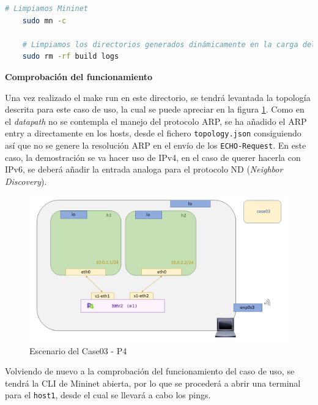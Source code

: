\begin{lstlisting}[language= bash, style=Consola, caption={Limpieza segura del escenario P4 - Case03},label=code:case03_p4_ether_unload2]
    # Limpiamos Mininet
    sudo mn -c
    
    # Limpiamos los directorios generados dinámicamente en la carga del escenario
    sudo rm -rf build logs
\end{lstlisting}


\vspace{1cm}
\textbf{Comprobación del funcionamiento}\\
\par

Una vez realizado el make run en este directorio, se tendrá levantada la topología descrita para este caso de uso, la cual se puede apreciar en la figura \ref{fig:case03_p4_ether_scenario}. Como en el \textit{datapath} no se contempla el manejo del protocolo ARP, se ha añadido el ARP entry a directamente en los hosts, desde el fichero \texttt{topology.json} consiguiendo así que no se genere la resolución ARP en el envío de los \texttt{ECHO-Request}. En este caso, la demostración se va hacer uso de IPv4, en el caso de querer hacerla con IPv6, se deberá añadir la entrada analoga para el protocolo ND  (\textit{Neighbor Discovery}).\\
\par
\begin{figure}[ht]
    \centering
    \includegraphics[width=16cm]{archivos/img/dev/p4/case03/scenario.png}
    \caption{Escenario del Case03 - P4}
    \label{fig:case03_p4_ether_scenario}
\end{figure}

Volviendo de nuevo a la comprobación del funcionamiento del caso de uso, se tendrá la CLI de Mininet abierta, por lo que se procederá a abrir una terminal para el \texttt{host1}, desde el cual se llevará a cabo los pings.

